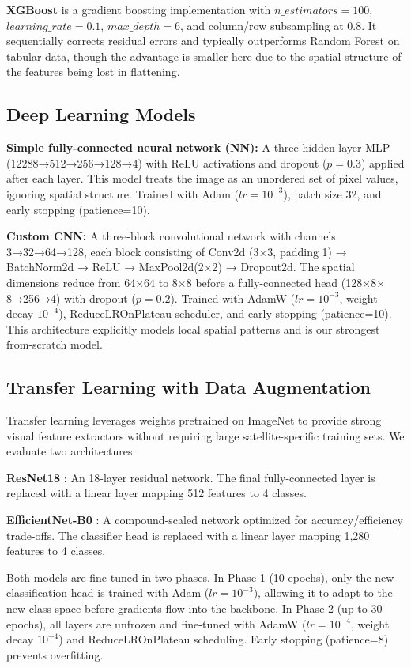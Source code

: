 \documentclass[12pt, a4paper]{article}
\begin{document}
\textbf{XGBoost} is a gradient boosting implementation with $n\_estimators=100$, $learning\_rate=0.1$, $max\_depth=6$, and column/row subsampling at 0.8. It sequentially corrects residual errors and typically outperforms Random Forest on tabular data, though the advantage is smaller here due to the spatial structure of the features being lost in flattening.

\subsection{Deep Learning Models}

\textbf{Simple fully-connected neural network (NN):} A three-hidden-layer MLP (12288→512→256→128→4) with ReLU activations and dropout ($p=0.3$) applied after each layer. This model treats the image as an unordered set of pixel values, ignoring spatial structure. Trained with Adam ($lr=10^{-3}$), batch size 32, and early stopping (patience=10).

\textbf{Custom CNN:} A three-block convolutional network with channels 3→32→64→128, each block consisting of Conv2d (3$\times$3, padding 1) → BatchNorm2d → ReLU → MaxPool2d(2$\times$2) → Dropout2d. The spatial dimensions reduce from 64$\times$64 to 8$\times$8 before a fully-connected head (128$\times$8$\times$8→256→4) with dropout ($p=0.2$). Trained with AdamW ($lr=10^{-3}$, weight decay $10^{-4}$), ReduceLROnPlateau scheduler, and early stopping (patience=10). This architecture explicitly models local spatial patterns and is our strongest from-scratch model.

\subsection{Transfer Learning with Data Augmentation}

Transfer learning leverages weights pretrained on ImageNet \cite{imagenet} to provide strong visual feature extractors without requiring large satellite-specific training sets. We evaluate two architectures:

\textbf{ResNet18} \cite{resnet}: An 18-layer residual network. The final fully-connected layer is replaced with a linear layer mapping 512 features to 4 classes.

\textbf{EfficientNet-B0} \cite{efficientnet}: A compound-scaled network optimized for accuracy/efficiency trade-offs. The classifier head is replaced with a linear layer mapping 1,280 features to 4 classes.

Both models are fine-tuned in two phases. In Phase 1 (10 epochs), only the new classification head is trained with Adam ($lr=10^{-3}$), allowing it to adapt to the new class space before gradients flow into the backbone. In Phase 2 (up to 30 epochs), all layers are unfrozen and fine-tuned with AdamW ($lr=10^{-4}$, weight decay $10^{-4}$) and ReduceLROnPlateau scheduling. Early stopping (patience=8) prevents overfitting.
\end{document}

